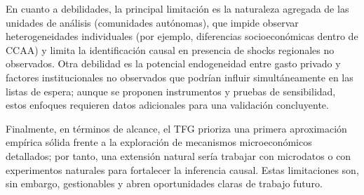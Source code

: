 En cuanto a debilidades, la principal limitación es la naturaleza agregada de
las unidades de análisis (comunidades autónomas), que impide observar heterogeneidades
individuales (por ejemplo, diferencias socioeconómicas dentro de CCAA) y limita
la identificación causal en presencia de shocks regionales no observados. Otra
debilidad es la potencial endogeneidad entre gasto privado y factores institucionales
no observados que podrían influir simultáneamente en las listas de espera; aunque
se proponen instrumentos y pruebas de sensibilidad, estos enfoques requieren
datos adicionales para una validación concluyente.

Finalmente, en términos de alcance, el TFG prioriza una primera aproximación
empírica sólida frente a la exploración de mecanismos microeconómicos detallados;
por tanto, una extensión natural sería trabajar con microdatos o con experimentos
naturales para fortalecer la inferencia causal. Estas limitaciones son, sin
embargo, gestionables y abren oportunidades claras de trabajo futuro.

